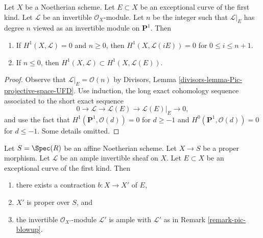 \begin{lemma}
\label{lemma-lift-sections-and-h1}
Let $X$ be a Noetherian scheme. Let $E \subset X$ be an
exceptional curve of the first kind. Let $\mathcal{L}$ be
an invertible $\mathcal{O}_X$-module.
Let $n$ be the integer such that $\mathcal{L}|_E$ has degree $n$
viewed as an invertible module on $\mathbf{P}^1$. Then
\begin{enumerate}
\item If $H^1(X, \mathcal{L}) = 0$ and $n \geq 0$, then
$H^1(X, \mathcal{L}(iE)) = 0$ for $0 \leq i \leq n + 1$.
\item If $n \leq 0$, then
$H^1(X, \mathcal{L}) \subset H^1(X, \mathcal{L}(E))$.
\end{enumerate}
\end{lemma}

\begin{proof}
Observe that $\mathcal{L}|_E = \mathcal{O}(n)$ by
Divisors, Lemma \ref{divisors-lemma-Pic-projective-space-UFD}.
Use induction, the long exact cohomology sequence associated to the
short exact sequence
$$
0 \to \mathcal{L} \to \mathcal{L}(E) \to \mathcal{L}(E)|_E \to 0,
$$
and use the fact that $H^1(\mathbf{P}^1, \mathcal{O}(d)) = 0$ for
$d \geq -1$ and $H^0(\mathbf{P}^1, \mathcal{O}(d)) = 0$ for
$d \leq -1$. Some details omitted.
\end{proof}

\begin{lemma}
\label{lemma-contract-ample}
Let $S = \Spec(R)$ be an affine Noetherian scheme.
Let $X \to S$ be a proper morphism. Let $\mathcal{L}$ be an
ample invertible sheaf on $X$. Let $E \subset X$ be an
exceptional curve of the first kind. Then
\begin{enumerate}
\item there exists a contraction $b : X \to X'$ of $E$,
\item $X'$ is proper over $S$, and
\item the invertible $\mathcal{O}_{X'}$-module $\mathcal{L}'$
is ample with $\mathcal{L}'$ as in Remark \ref{remark-pic-blowup}.
\end{enumerate}
\end{lemma}

